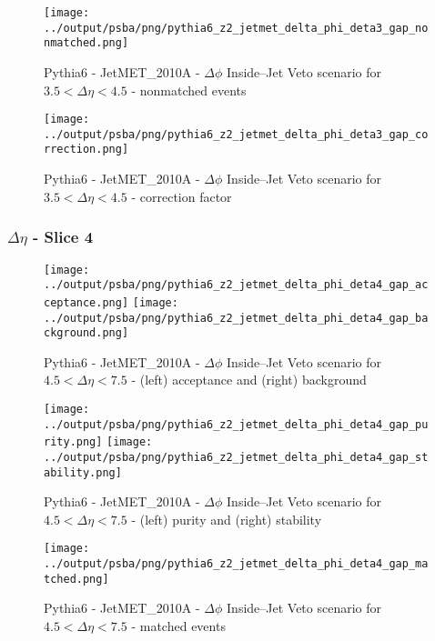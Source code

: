 \documentclass[11pt]{book}
\begin{document}
\begin{figure}[ht]
\centering
\texttt{[image: ../output/psba/png/pythia6\_z2\_jetmet\_delta\_phi\_deta3\_gap\_nonmatched.png]}
\caption{Pythia6 - JetMET\_2010A - $\Delta\phi$ Inside--Jet Veto scenario for $3.5 < \Delta\eta < 4.5$ - nonmatched events}
\label{fig:p6_jetmet_delta_phi_deta3_gap_nonmatched}
\end{figure}

\begin{figure}[ht]
\centering
\texttt{[image: ../output/psba/png/pythia6\_z2\_jetmet\_delta\_phi\_deta3\_gap\_correction.png]}
\caption{Pythia6 - JetMET\_2010A - $\Delta\phi$ Inside--Jet Veto scenario for $3.5 < \Delta\eta < 4.5$ - correction factor}
\label{fig:p6_jetmet_delta_phi_deta3_gap_correction}
\end{figure}


\clearpage
\subsubsection{$\Delta\eta$ - Slice 4}
\begin{figure}[ht]
\centering
\texttt{[image: ../output/psba/png/pythia6\_z2\_jetmet\_delta\_phi\_deta4\_gap\_acceptance.png]}
\texttt{[image: ../output/psba/png/pythia6\_z2\_jetmet\_delta\_phi\_deta4\_gap\_background.png]}
\caption{Pythia6 - JetMET\_2010A - $\Delta\phi$ Inside--Jet Veto scenario for $4.5 < \Delta\eta < 7.5$ - (left) acceptance and (right) background}
\label{fig:p6_jetmet_delta_phi_deta4_gap_ab}
\end{figure}

\begin{figure}[ht]
\centering
\texttt{[image: ../output/psba/png/pythia6\_z2\_jetmet\_delta\_phi\_deta4\_gap\_purity.png]}
\texttt{[image: ../output/psba/png/pythia6\_z2\_jetmet\_delta\_phi\_deta4\_gap\_stability.png]}
\caption{Pythia6 - JetMET\_2010A - $\Delta\phi$ Inside--Jet Veto scenario for $4.5 < \Delta\eta < 7.5$ - (left) purity and (right) stability}
\label{fig:p6_jetmet_delta_phi_deta4_gap_ps}
\end{figure}

\begin{figure}[ht]
\centering
\texttt{[image: ../output/psba/png/pythia6\_z2\_jetmet\_delta\_phi\_deta4\_gap\_matched.png]}
\caption{Pythia6 - JetMET\_2010A - $\Delta\phi$ Inside--Jet Veto scenario for $4.5 < \Delta\eta < 7.5$ - matched events}
\label{fig:p6_jetmet_delta_phi_deta4_gap_matched}
\end{figure}
\end{document}
